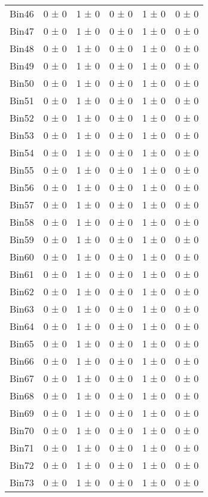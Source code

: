 \begin{tabular}{@{\extracolsep{4pt}}lccccc@{}}
     Bin46 & 0 ± 0 & 1 ± 0 & 0 ± 0 & 1 ± 0 & 0 ± 0 \\ 
     Bin47 & 0 ± 0 & 1 ± 0 & 0 ± 0 & 1 ± 0 & 0 ± 0 \\ 
     Bin48 & 0 ± 0 & 1 ± 0 & 0 ± 0 & 1 ± 0 & 0 ± 0 \\ 
     Bin49 & 0 ± 0 & 1 ± 0 & 0 ± 0 & 1 ± 0 & 0 ± 0 \\ 
     Bin50 & 0 ± 0 & 1 ± 0 & 0 ± 0 & 1 ± 0 & 0 ± 0 \\ 
     Bin51 & 0 ± 0 & 1 ± 0 & 0 ± 0 & 1 ± 0 & 0 ± 0 \\ 
     Bin52 & 0 ± 0 & 1 ± 0 & 0 ± 0 & 1 ± 0 & 0 ± 0 \\ 
     Bin53 & 0 ± 0 & 1 ± 0 & 0 ± 0 & 1 ± 0 & 0 ± 0 \\ 
     Bin54 & 0 ± 0 & 1 ± 0 & 0 ± 0 & 1 ± 0 & 0 ± 0 \\ 
     Bin55 & 0 ± 0 & 1 ± 0 & 0 ± 0 & 1 ± 0 & 0 ± 0 \\ 
     Bin56 & 0 ± 0 & 1 ± 0 & 0 ± 0 & 1 ± 0 & 0 ± 0 \\ 
     Bin57 & 0 ± 0 & 1 ± 0 & 0 ± 0 & 1 ± 0 & 0 ± 0 \\ 
     Bin58 & 0 ± 0 & 1 ± 0 & 0 ± 0 & 1 ± 0 & 0 ± 0 \\ 
     Bin59 & 0 ± 0 & 1 ± 0 & 0 ± 0 & 1 ± 0 & 0 ± 0 \\ 
     Bin60 & 0 ± 0 & 1 ± 0 & 0 ± 0 & 1 ± 0 & 0 ± 0 \\ 
     Bin61 & 0 ± 0 & 1 ± 0 & 0 ± 0 & 1 ± 0 & 0 ± 0 \\ 
     Bin62 & 0 ± 0 & 1 ± 0 & 0 ± 0 & 1 ± 0 & 0 ± 0 \\ 
     Bin63 & 0 ± 0 & 1 ± 0 & 0 ± 0 & 1 ± 0 & 0 ± 0 \\ 
     Bin64 & 0 ± 0 & 1 ± 0 & 0 ± 0 & 1 ± 0 & 0 ± 0 \\ 
     Bin65 & 0 ± 0 & 1 ± 0 & 0 ± 0 & 1 ± 0 & 0 ± 0 \\ 
     Bin66 & 0 ± 0 & 1 ± 0 & 0 ± 0 & 1 ± 0 & 0 ± 0 \\ 
     Bin67 & 0 ± 0 & 1 ± 0 & 0 ± 0 & 1 ± 0 & 0 ± 0 \\ 
     Bin68 & 0 ± 0 & 1 ± 0 & 0 ± 0 & 1 ± 0 & 0 ± 0 \\ 
     Bin69 & 0 ± 0 & 1 ± 0 & 0 ± 0 & 1 ± 0 & 0 ± 0 \\ 
     Bin70 & 0 ± 0 & 1 ± 0 & 0 ± 0 & 1 ± 0 & 0 ± 0 \\ 
     Bin71 & 0 ± 0 & 1 ± 0 & 0 ± 0 & 1 ± 0 & 0 ± 0 \\ 
     Bin72 & 0 ± 0 & 1 ± 0 & 0 ± 0 & 1 ± 0 & 0 ± 0 \\ 
     Bin73 & 0 ± 0 & 1 ± 0 & 0 ± 0 & 1 ± 0 & 0 ± 0 \\ 

\end{tabular}
